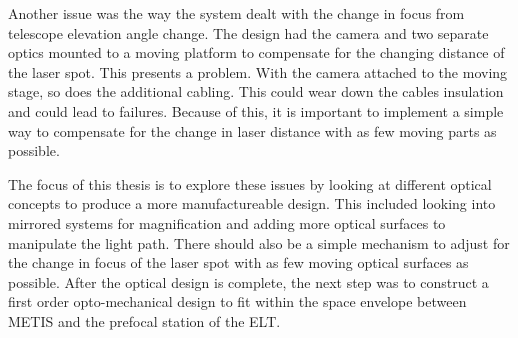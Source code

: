 Another issue was the way the system dealt with the change in focus from telescope
elevation angle change.  The design had the camera and two separate optics mounted
to a moving platform to compensate for the changing distance of the laser spot. 
This presents a problem.  With the camera attached to the moving stage, so does the
additional cabling.  This could wear down the cables insulation and could lead to
failures.  Because of this, it is important to implement a simple way to compensate
for the change in laser distance with as few moving parts as possible.

The focus of this thesis is to explore these issues by looking at different optical
concepts to produce a more manufactureable design.  This included looking into
mirrored systems for magnification and adding more optical surfaces to manipulate
the light path.  There should also be a simple mechanism to adjust for the change in
focus of the laser spot with as few moving optical surfaces as possible.  After the
optical design is complete, the next step was to construct a first order
opto-mechanical design to fit within the space envelope between METIS and the
prefocal station of the ELT.




